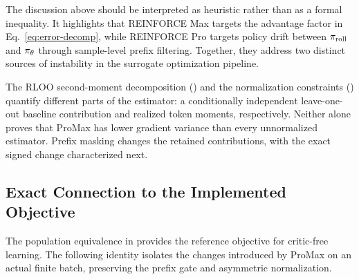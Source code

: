 \begin{remark}
The discussion above should be interpreted as heuristic rather than as a formal inequality. It highlights that REINFORCE Max targets the
advantage factor in Eq.~\eqref{eq:error-decomp}, while REINFORCE Pro targets policy drift between $\pi_{\mathrm{roll}}$ and $\pi_{\theta}$ through sample-level
prefix filtering.
Together, they address two distinct sources of instability in the surrogate optimization pipeline.
\end{remark}

\begin{remark}
The RLOO second-moment decomposition () and the normalization constraints () quantify
different parts of the estimator: a conditionally independent leave-one-out baseline contribution and realized token moments, respectively.
Neither alone proves that ProMax has lower gradient variance than every unnormalized estimator.
Prefix masking changes the retained contributions, with the exact signed change characterized next.
\end{remark}

\subsection{Exact Connection to the Implemented Objective}

The population equivalence in  provides the reference objective for critic-free learning.
The following identity isolates the changes introduced by ProMax on an actual finite batch, preserving the prefix gate and
asymmetric normalization.

